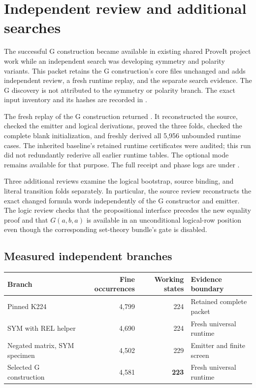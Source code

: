 \section{Independent review and additional searches}
\label{sec:additional-review}

The successful G construction became available in existing shared ProveIt
project work while an independent search was developing symmetry and
polarity variants.  This packet retains the G construction's core
 files unchanged and adds independent review, a fresh
runtime replay, and the separate search evidence.  The G discovery is not
attributed to the symmetry or polarity branch.  The exact input inventory
and its hashes are recorded in .

The fresh replay of the G construction returned
.  It reconstructed the source, checked the
emitter and logical derivations, proved the three folds, checked the
complete blank initialization, and freshly derived all 5,956 unbounded
runtime cases.  The inherited baseline's retained runtime certificates
were audited; this run did not redundantly rederive all earlier runtime
tables.  The optional  mode remains available for
that purpose.  The full receipt and phase logs are under
.

Three additional reviews examine the logical bootstrap, source binding,
and literal transition folds separately.  In particular, the source
review reconstructs the exact changed formula words independently of
the G constructor and emitter.  The logic review checks that the
propositional interface precedes the new equality proof and that
$G(a,b,a)$ is available in an unconditional logical-row position even
though the corresponding set-theory bundle's gate is disabled.

\subsection{Measured independent branches}

\begin{center}
\small
\setlength{\tabcolsep}{4pt}
\begin{tabular}{lrrl}
\toprule
Branch & Fine occurrences & Working states & Evidence boundary\\
\midrule
Pinned K224 & 4,799 & 224 & Retained complete packet\\
SYM with REL helper & 4,690 & 224 & Fresh universal runtime\\
Negated matrix, SYM specimen & 4,502 & 229 & Emitter and finite screen\\
Selected G construction & 4,581 & \textbf{223} & Fresh universal runtime\\
\bottomrule
\end{tabular}
\end{center}

